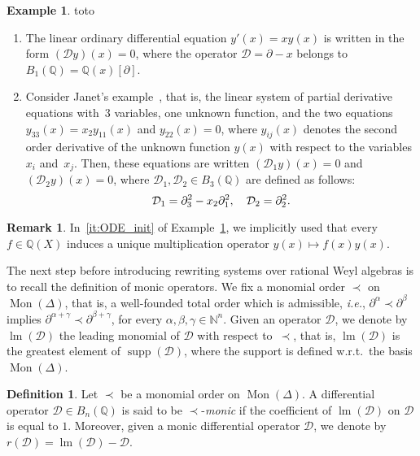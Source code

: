 \documentclass[11pt]{article}
\theoremstyle{definition}
\newtheorem{definition}[theorem]{Definition}
\newtheorem{remark}[theorem]{Remark}
\newtheorem{example}[theorem]{Example}
\newcommand\ie{\emph{i.e.}}
\newcommand\wrt{w.r.t.}
\newcommand\D{\mathcal{D}}
\DeclareMathOperator{\supp}{supp}
\DeclareMathOperator{\lm}{lm}
\newcommand\Q{\mathbb{Q}}
\newcommand\N{\mathbb{N}}
\newcommand\Weyl[1]{B_{#1}(\Q)}
\newcommand\monBasis{\Mon(\Delta)}
\DeclareMathOperator{\Mon}{Mon}
\begin{document}
\begin{example}\label{ex:diff_operators_init}
  {\color{white}toto}
  \begin{enumerate}
  \item\label{it:ODE_init} The linear ordinary differential equation
    $y'(x)=xy(x)$ is written in the form $(\D y)(x)=0$, where the operator
    $\D=\partial-x$ belongs to $\Weyl{1}=\Q(x)[\partial]$. 
  \item\label{it:Janet_example_init} Consider Janet's
    example~\cite{MR1308976}, that is, the linear system of partial
    derivative equations with~$3$ variables, one unknown function, and
    the two equations $y_{33}(x)=x_2y_{11}(x)$ and $y_{22}(x)=0$, where
    $y_{ij}(x)$ denotes the second order derivative of the unknown
    function $y(x)$ with respect to the variables $x_i$ and~$x_j$. Then,
    these equations are written $(\D_1y)(x)=0$ and $(\D_2y)(x)=0$, where
    $\D_1,\D_2\in\Weyl{3}$ are defined as follows:
    \[\D_1=\partial_3^2-x_2\partial_1^2,\quad \D_2=\partial_2^2.
    \smallskip\]
  \end{enumerate}
\end{example}

\begin{remark}
  In~\ref{it:ODE_init} of Example~\ref{ex:diff_operators_init}, we
  implicitly used that every $f\in\Q(X)$ induces a unique multiplication
  operator $y(x)\mapsto f(x)y(x)$.
\end{remark}
\smallskip

The next step before introducing rewriting systems over rational Weyl
algebras is to recall the definition of monic operators. We fix a
monomial order $\prec$ on $\monBasis$, that is, a well-founded total 
order which is admissible, \ie, $\partial^{\alpha}\prec\partial^{\beta}$
implies $\partial^{\alpha+\gamma}\prec\partial^{\beta+\gamma}$, for every
$\alpha,\beta,\gamma\in\N^n$. Given an operator $\D$, we denote by
$\lm(\D)$ the leading monomial of $\D$ with respect to~$\prec$, that 
is, $\lm(\D)$ is the greatest element of $\supp(\D)$, where the support 
is defined \wrt\ the basis $\monBasis$. 
\smallskip

\begin{definition}
  Let $\prec$ be a monomial order on $\monBasis$. A differential
  operator $\D\in\Weyl{n}$ is said to be $\prec$-{\em monic} if the
  coefficient of $\lm(\D)$ on $\D$ is equal to $1$. Moreover, given a
  monic differential operator $\D$, we denote by $r(\D)=\lm(\D)-\D$.
\end{definition}
\smallskip
\end{document}
